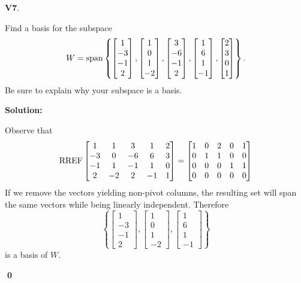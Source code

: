 \documentclass{article}
\newenvironment{problem}[1]
{
  \begin{flushleft}
  \textbf{#1}.
  \ignorespaces
}
{
  \end{flushleft}
}
\newenvironment{solution}
{
  \ignorespaces
  \textbf{Solution:}
}
{
  \ignorespacesafterend
  \begin{flushright}
  {\bfseries \qed}
  \end{flushright}
}
\begin{document}
\begin{problem}{V7}
Find a basis for the subspace 
\[
  W = \operatorname{span} \left\{
  \begin{bmatrix} 1 \\ -3 \\ -1 \\ 2 \end{bmatrix} ,
  \begin{bmatrix} 1 \\ 0 \\ 1 \\ -2 \end{bmatrix} ,
  \begin{bmatrix} 3 \\ -6 \\ -1 \\ 2 \end{bmatrix} ,
  \begin{bmatrix} 1 \\ 6 \\ 1 \\ -1 \end{bmatrix} ,
  \begin{bmatrix} 2 \\ 3 \\ 0 \\ 1 \end{bmatrix}
  \right\} .
\]
Be sure to explain why your subspace is a basis.
\end{problem}
\begin{solution}
Observe that
\[ \operatorname{RREF}
    \begin{bmatrix}
    1 & 1 & 3 & 1 & 2 \\
    -3 & 0 & -6 & 6 & 3 \\
    -1 & 1 & -1 & 1 & 0 \\
    2 & -2 & 2 & -1 & 1
    \end{bmatrix} =
    \begin{bmatrix}
    1 & 0 & 2 & 0 & 1 \\
    0 & 1 & 1 & 0 & 0 \\
    0 & 0 & 0 & 1 & 1 \\
    0 & 0 & 0 & 0 & 0
    \end{bmatrix}
\]
If we remove the vectors yielding non-pivot columns, the resulting
set will span the same vectors while being linearly independent.
Therefore
\[\left\{
  \begin{bmatrix} 1 \\ -3 \\ -1 \\ 2 \end{bmatrix} ,
  \begin{bmatrix} 1 \\ 0 \\ 1 \\ -2 \end{bmatrix} ,
  \begin{bmatrix} 1 \\ 6 \\ 1 \\ -1 \end{bmatrix}
  \right\}
\]
is a basis of \(W\).
\end{solution}
\end{document}
